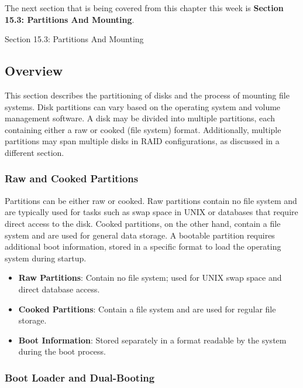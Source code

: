 The next section that is being covered from this chapter this week is \textbf{Section 15.3: Partitions And Mounting}.

\begin{notes}{Section 15.3: Partitions And Mounting}
    \subsection*{Overview}

    This section describes the partitioning of disks and the process of mounting file systems. Disk partitions can vary based on the operating system and volume management software. A disk may be divided 
    into multiple partitions, each containing either a raw or cooked (file system) format. Additionally, multiple partitions may span multiple disks in RAID configurations, as discussed in a different section.
    
    \subsubsection*{Raw and Cooked Partitions}
    
    Partitions can be either raw or cooked. Raw partitions contain no file system and are typically used for tasks such as swap space in UNIX or databases that require direct access to the disk. Cooked 
    partitions, on the other hand, contain a file system and are used for general data storage. A bootable partition requires additional boot information, stored in a specific format to load the operating 
    system during startup.
    
    \begin{highlight}
    
        \begin{itemize}
            \item \textbf{Raw Partitions}: Contain no file system; used for UNIX swap space and direct database access.
            \item \textbf{Cooked Partitions}: Contain a file system and are used for regular file storage.
            \item \textbf{Boot Information}: Stored separately in a format readable by the system during the boot process.
        \end{itemize}
    
    \end{highlight}
    
    \subsubsection*{Boot Loader and Dual-Booting}
    

\end{notes}
